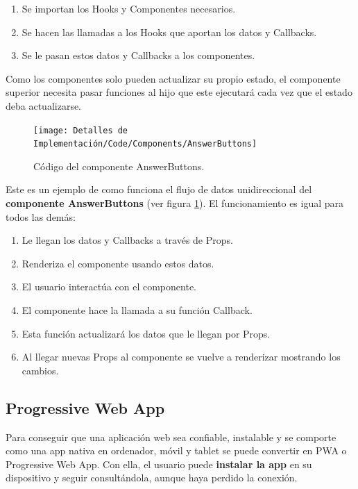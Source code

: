 \documentclass[12pt,twoside,titlepage]{report}
\begin{document}
\begin{enumerate}
    \item  Se importan los Hooks y Componentes necesarios.
    \item  Se hacen las llamadas a los Hooks que aportan los datos y Callbacks.
    \item  Se le pasan estos datos y Callbacks a los componentes.
\end{enumerate}

Como los componentes solo pueden actualizar su propio estado, el componente superior necesita pasar funciones al hijo que este ejecutará cada vez que el estado deba actualizarse.

\begin{figure}[H]
    \centering
    \texttt{[image: Detalles de Implementación/Code/Components/AnswerButtons]}
    \caption{Código del componente AnswerButtons.}
    \label{fig:AnswerButtons}
\end{figure}

Este es un ejemplo de como funciona el flujo de datos unidireccional del \textbf{componente AnswerButtons} (ver figura \ref{fig:AnswerButtons}). El funcionamiento es igual para todos las demás: 

\begin{enumerate}
    \item Le llegan los datos y Callbacks a través de Props.
    \item Renderiza el componente usando estos datos.
    \item El usuario interactúa con el componente.
    \item El componente hace la llamada a su función Callback.
    \item Esta función actualizará los datos que le llegan por Props.
    \item Al llegar nuevas Props al componente se vuelve a renderizar mostrando los cambios.
\end{enumerate}


\subsection{Progressive Web App}
Para conseguir que una aplicación web sea confiable, instalable y se comporte como una app nativa en ordenador, móvil y tablet se puede convertir en PWA o Progressive Web App. Con ella, el usuario puede \textbf{instalar la app} en su dispositivo y seguir consultándola, aunque haya perdido la conexión.
\cite{pwa1}
\end{document}
